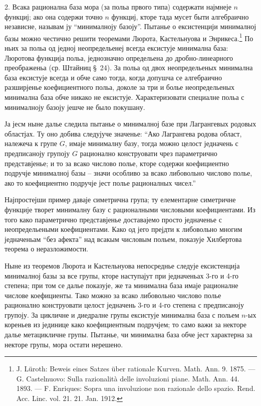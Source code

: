 \documentclass[11pt]{article}
\begin{document}
2. Всака рационална база мора (за польа првого типа) содержати најмнеје $n$ функциј; ако она содержи точно $n$ функциј, кторе тада мусет быти алгебраично независне, называм ју ``минималноју базоју''. Пытанье о ексистенцији минималној базы можно честично решити теоремами Люрота, Кастельнуова и Энрикеса.\footnote{J. Lüroth: Beweis eines Satzes über rationale Kurven. Math. Ann. 9. 1875. --- G. Castelnuovo: Sulla razionalità delle involuzioni piane. Math. Ann. 44. 1893. --- F. Enriques: Sopra una involuzione non razionale dello spazio. Rend. Acc. Linc. vol. 21. 21. Jan. 1912.} По ньих за польа од једној неопредельенеј всегда ексистује минимална база: Люротова функција польа, једнозначно определьена до дробно-линеарного преображеньа (ср. Штайниц \S\ 24). За польа од двох неопредельеных минимална база ексистује всегда и обче само тогда, когда допушча се алгебраично разширјенье коефициентного польа, доколе за три и болье неопредельеных минимална база обче никако не ексистује. Характеризовати специалне польа с минималноју базоју јешче не было покушану.

Ја јесм ныне далье следила пытанье о минималној базе при Лагрангевых родовых областјах. Ту оно добива следујуче значенье: ``Ако Лагрангева родова област, належеча к групе $G$, имаје минималну базу, тогда можно целост једначень с предписаноју групоју $G$ рационално конструовати чрез параметрично представјенье; и то за всако числово полье, кторе содержи коефициентно подручје минималној базы -- значи особливо за всако либовольно числово полье, ако то коефициентно подручје јест полье рационалных чисел.''

Најпростејши пример даваје симетрична група; ту елементарне симетричне функције творет минималну базу с рационалными числовыми коефициентами. Из того како параметрично представјенье доставајемо просто једначенье с неопредельеными коефициентами. Како од јего прејдти к либовольно многим једначеньам ``без афекта'' над всакым числовым польем, показује Хилбертова теорема о неразложимости.

Ныне из теоремов Люрота и Кастельнуова непосреднье следује ексистенција минималној базы за все групы, кторе наступајут при једначеньах 3-го и 4-го степена; при том се далье показује, же та минимална база имаје рационалне числове коефициенты. Тако можно за всако либовольно числово полье рационално конструовати целост једначень 3-го и 4-го степена с предписаноју групоју. За цикличне и диедралне групы ексистује минимална база с польем $n$-ых кореньев из јединице како коефициентным подручјем; то само важи за некторе далье метацикличне групы. Пытанье, чи минимална база обче јест характерна за некторе групы, мора остати нерешено.
\end{document}
